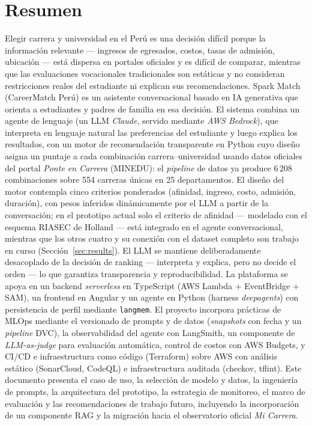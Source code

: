 \tableofcontents
\newpage

\section*{Resumen}

Elegir carrera y universidad en el Per\'u es una decisi\'on dif\'icil porque la
informaci\'on relevante --- ingresos de egresados, costos, tasas de admisi\'on,
ubicaci\'on --- est\'a dispersa en portales oficiales y es dif\'icil de comparar,
mientras que las evaluaciones vocacionales tradicionales son est\'aticas y no
consideran restricciones reales del estudiante ni explican sus recomendaciones.
Spark Match (CareerMatch Per\'u) es un asistente conversacional basado en IA
generativa que orienta a estudiantes y padres de familia en esa decisi\'on. El
sistema combina un agente de lenguaje (un LLM \emph{Claude}, servido mediante
\emph{AWS Bedrock}), que interpreta en lenguaje natural las preferencias del
estudiante y luego explica los resultados, con un motor de recomendaci\'on
transparente en Python cuyo dise\~no asigna un puntaje a cada combinaci\'on
carrera--universidad usando datos oficiales del portal \emph{Ponte en Carrera}
(MINEDU): el \emph{pipeline} de datos ya produce 6\,208 combinaciones sobre 554
carreras \'unicas en 25 departamentos. El dise\~no del motor contempla cinco
criterios ponderados (afinidad, ingreso, costo, admisi\'on, duraci\'on), con
pesos inferidos din\'amicamente por el LLM a partir de la conversaci\'on; en el
prototipo actual solo el criterio de afinidad --- modelado con el esquema
RIASEC de Holland --- est\'a integrado en el agente conversacional, mientras que
los otros cuatro y su conexi\'on con el dataset completo son trabajo en curso
(Secci\'on~\ref{sec:results}). El LLM se mantiene deliberadamente desacoplado de
la decisi\'on de ranking --- interpreta y explica, pero no decide el orden ---
lo que garantiza transparencia y reproducibilidad.
La plataforma se apoya en un backend \emph{serverless} en TypeScript (AWS Lambda
+ EventBridge + SAM), un frontend en Angular y un agente en Python (harness
\emph{deepagents}) con persistencia de perfil mediante \texttt{langmem}. El
proyecto incorpora pr\'acticas de MLOps mediante el versionado de prompts y de
datos (\emph{snapshots} con fecha y un \emph{pipeline} DVC), la observabilidad
del agente con LangSmith, un componente de \emph{LLM-as-judge} para evaluaci\'on
autom\'atica, control de costos con AWS Budgets, y CI/CD e infraestructura como
c\'odigo (Terraform) sobre AWS con
an\'alisis est\'atico (SonarCloud, CodeQL) e infraestructura auditada (checkov,
tflint). Este documento presenta el caso de uso, la selecci\'on de modelo y
datos, la ingenier\'ia de prompts, la arquitectura del prototipo, la estrategia
de monitoreo, el marco de evaluaci\'on y las recomendaciones de trabajo futuro,
incluyendo la incorporaci\'on de un componente RAG y la migraci\'on hacia el
observatorio oficial \emph{Mi Carrera}.


